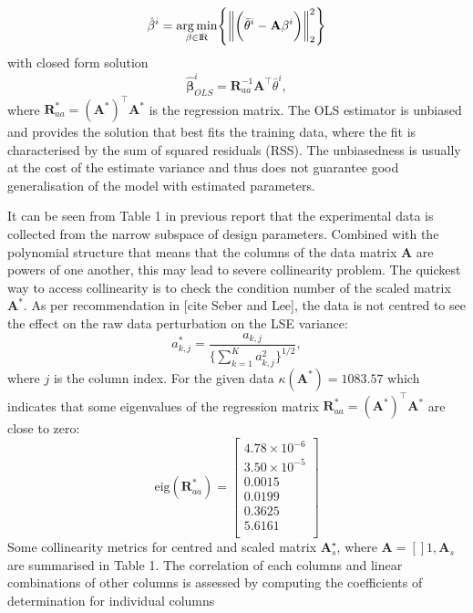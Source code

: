 \documentclass[a4paper,11pt,twoside]{article}
\newcommand{\norm}[1]{\left\lVert#1\right\rVert}
\DeclareMathOperator{\R}{\rm I\!R}
\theoremstyle{mytheoremstyle}
\begin{document}
\begin{equation}
\hat{\mathbf{\beta}}^i = \underset{\beta \in \R}{\arg \min} \Biggl\{\norm{ \biggl(\bar{\theta}^i - \mathbf{A} \mathbf{\beta}^i \biggr) }^{2}_{2}\Biggr\}
\end{equation}
with closed form solution
\begin{equation}
\hat{\mathbf{\beta}}^{i}_{OLS} = \mathbf{R}^{-1}_{aa} \mathbf{A}^{\top}\bar{\theta}^i,  
\end{equation} 
where $\mathbf{R}^{\ast}_{aa} = (\mathbf{A}^\ast)^{\top}\mathbf{A}^\ast$ is the regression matrix. The OLS estimator is unbiased and provides the solution that best fits the training data, where the fit is characterised by the sum of squared residuals (RSS). The unbiasedness is usually at the cost of the estimate variance and thus does not guarantee good generalisation of the model with estimated parameters. 
\par It can be seen from Table 1 in previous report that the experimental data is collected from the narrow subspace of design parameters. Combined with the polynomial structure that means that the columns of the data matrix $\mathbf{A} $ are powers of one another, this may lead to severe collinearity problem. The quickest way to access collinearity is to check the condition number of the scaled matrix $\mathbf{A}^\ast$. As per recommendation in [cite Seber and Lee], the data is not centred to see the effect on the raw data perturbation on the LSE variance:
\begin{equation*}
a^{\ast}_{k,j} = \frac{a_{k,j}}{\Big\{ \sum^{K}_{k=1} a^{2}_{k,j}\Big\}^{1/2}}, 
\end{equation*}
where $j$ is the column index.
For the given data $\kappa(\mathbf{A}^\ast) = 1083.57$ which indicates that some eigenvalues of the regression matrix $\mathbf{R}^{\ast}_{aa} = (\mathbf{A}^\ast)^{\top}\mathbf{A}^\ast$ are close to zero:
\begin{equation*}
\text{eig}(\mathbf{R}^{\ast}_{aa}) = \left[\begin{array}{r}
4.78 \times 10^{-6} \\
3.50 \times 10^{-5} \\
0.0015	\\
0.0199	\\
0.3625	\\
5.6161	\\
\end{array}\right]
\end{equation*}
Some collinearity metrics for centred and scaled matrix $\mathbf{A}_{s}^{\star}$, where $\mathbf{A} = \left[\right]1, \mathbf{A}_{s}$ are summarised in Table 1. The correlation of each columns and linear combinations of other columns is assessed by computing the coefficients of determination for individual columns
\end{document}

